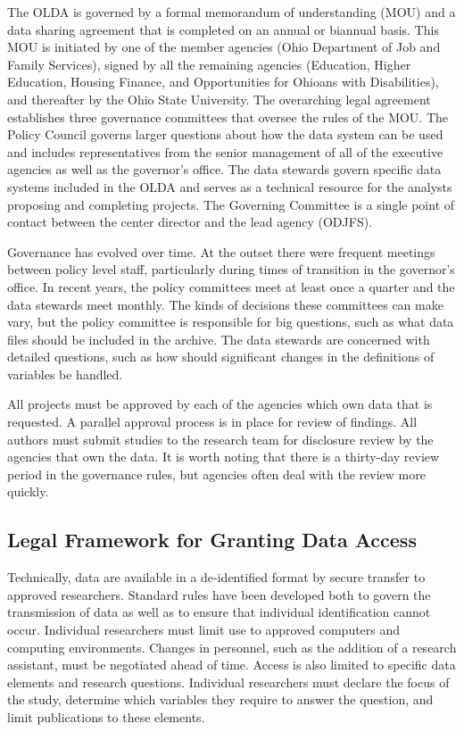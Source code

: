 The OLDA is governed by a formal memorandum of understanding (MOU) and a data sharing agreement that is completed on an annual or biannual basis. This MOU is initiated by one of the member agencies (Ohio Department of Job and Family Services), signed by all the remaining agencies (Education, Higher Education, Housing Finance, and Opportunities for Ohioans with Disabilities), and thereafter by the Ohio State University. The overarching legal agreement establishes three governance committees that oversee the rules of the MOU. The Policy Council governs larger questions about how the data system can be used and includes representatives from the senior management of all of the executive agencies as well as the governor's office. The data stewards govern specific data systems included in the OLDA and serves as a technical resource for the analysts proposing and completing projects. The Governing Committee is a single point of contact between the center director and the lead agency (ODJFS).

Governance has evolved over time. At the outset there were frequent meetings between policy level staff, particularly during times of transition in the governor's office. In recent years, the policy committees meet at least once a quarter and the data stewards meet monthly. The kinds of decisions these committees can make vary, but the policy committee is responsible for big questions, such as what data files should be included in the archive. The data stewards are concerned with detailed questions, such as how should significant changes in the definitions of variables be handled.

All projects must be approved by each of the agencies which own data that is requested. A parallel approval process is in place for review of findings. All authors must submit studies to the research team for disclosure review by the agencies that own the data. It is worth noting that there is a thirty-day review period in the governance rules, but agencies often deal with the review more quickly.

\hypertarget{legal-framework-for-granting-data-access-1}{%
\subsection{Legal Framework for Granting Data Access}\label{legal-framework-for-granting-data-access-1}}

Technically, data are available in a de-identified format by secure transfer to approved researchers. Standard rules have been developed both to govern the transmission of data as well as to ensure that individual identification cannot occur. Individual researchers must limit use to approved computers and computing environments. Changes in personnel, such as the addition of a research assistant, must be negotiated ahead of time. Access is also limited to specific data elements and research questions. Individual researchers must declare the focus of the study, determine which variables they require to answer the question, and limit publications to these elements.

